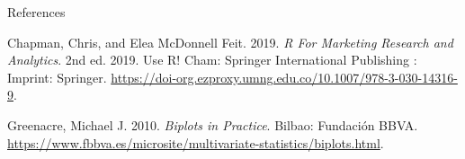 \documentclass[
  ignorenonframetext,
]{beamer}
\newlength{\cslhangindent}
\newenvironment{CSLReferences}[2] %
 {\begin{list}{}{%
  \setlength{\itemindent}{0pt}
  \setlength{\leftmargin}{0pt}
  \setlength{\parsep}{0pt}
  \ifodd #1
   \setlength{\leftmargin}{\cslhangindent}
   \setlength{\itemindent}{-1\cslhangindent}
  \fi
  \setlength{\itemsep}{#2\baselineskip}}}
 {\end{list}}
\begin{document}
\begin{frame}[allowframebreaks]{References}
\label{refs}
\begin{CSLReferences}{1}{0}
Chapman, Chris, and Elea McDonnell Feit. 2019. \emph{R {For} {Marketing}
{Research} and {Analytics}}. 2nd ed. 2019. Use {R}! Cham: Springer
International Publishing : Imprint: Springer.
\url{https://doi-org.ezproxy.umng.edu.co/10.1007/978-3-030-14316-9}.

Greenacre, Michael J. 2010. \emph{Biplots in Practice}. Bilbao:
Fundación BBVA.
\url{https://www.fbbva.es/microsite/multivariate-statistics/biplots.html}.

\end{CSLReferences}
\end{frame}
\end{document}
